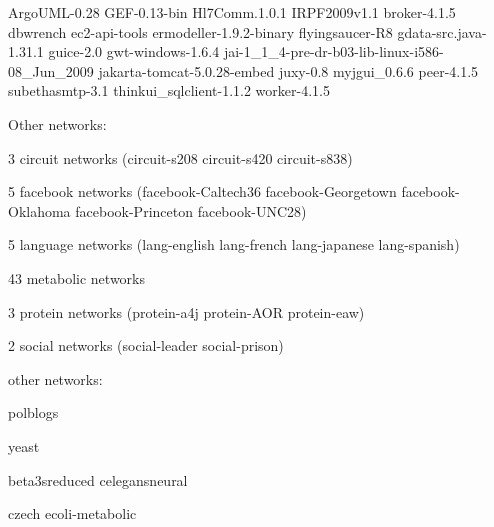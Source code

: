 ArgoUML-0.28
GEF-0.13-bin
Hl7Comm.1.0.1
IRPF2009v1.1
broker-4.1.5
dbwrench
ec2-api-tools
ermodeller-1.9.2-binary
flyingsaucer-R8
gdata-src.java-1.31.1
guice-2.0
gwt-windows-1.6.4
jai-1\_1\_4-pre-dr-b03-lib-linux-i586-08\_Jun\_2009
jakarta-tomcat-5.0.28-embed
juxy-0.8
myjgui\_0.6.6
peer-4.1.5
subethasmtp-3.1
thinkui\_sqlclient-1.1.2
worker-4.1.5

Other networks:

3 circuit networks (circuit-s208 circuit-s420 circuit-s838)

5 facebook networks (facebook-Caltech36 facebook-Georgetown facebook-Oklahoma
facebook-Princeton facebook-UNC28)

5 language networks (lang-english  lang-french lang-japanese lang-spanish)

43 metabolic networks

3 protein networks (protein-a4j protein-AOR protein-eaw)

2 social networks (social-leader social-prison)

other networks:

polblogs

yeast

beta3sreduced
celegansneural

czech
ecoli-metabolic
